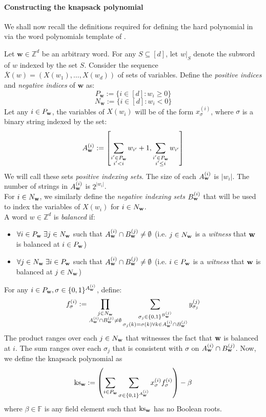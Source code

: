 \documentclass[11pt]{article}
\newcommand{\Boo}{\{0,1 \}}
\newcommand{\F}{\mathbb{F}}
\begin{document}
\paragraph{Constructing the knapsack polynomial}
We shall now recall the definitions required for defining the hard polynomial in \cite{GHT} via the word polynomials template of \cite{LST}. 

Let $\mathbf{w} \in \mathbb{Z}^d$ be an arbitrary word. For any $S\subseteq [d]$, let $w|_{S}$ denote the subword of $w$ indexed by the set $S$. Consider the sequence $\overline{X}(w) = (X(w_1),\dots, X(w_d))$ of sets of variables. Define the \emph{positive indices} and \emph{negative indices} of $\mathbf{w}$ as:
$$P_{\mathbf{w}} := \{i\in [d]: w_i \geq 0\}$$
$$N_{\mathbf{w}} := \{i\in [d]: w_i < 0\}$$
Let any $i\in P_{\mathbf{w}}$, the variables of $X(w_i)$ will be of the form $x_{\sigma}^{(i)}$, where $\sigma$ is a binary string indexed by the set:
$$A_{\mathbf{w}}^{(i)} := \left[ \sum_{\substack{i' \in P_{\mathbf{w}}\\ i'<i}} w_{i'} + 1,\sum_{\substack{i' \in P_{\mathbf{w}}\\ i'\leq i}}w_{i'}\right ]$$
We will call these sets \emph{positive indexing sets}. The size of each $A_{\mathbf{w}}^{(i)}$ is $|w_i|$. The number of strings in $A_{\mathbf{w}}^{(i)}$ is $2^{|w_i|}$. \\
For $i\in N_{\mathbf{w}}$, we similarly define the \emph{negative indexing sets} $B_{\mathbf{w}}^{(i)}$ that will be used to index the variables of $X(w_i)$ for $i\in N_{\mathbf{w}}$. \\
A word $w\in \mathbb{Z}^d$ is \emph{balanced} if:
\begin{itemize}
    \item $\forall i\in P_{\mathbf{w}} \; \exists j \in N_{\mathbf{w}}$ such that $A_{\mathbf{w}}^{(i)} \cap B_{\mathbf{w}}^{(j)} \neq \emptyset$ (i.e. $j\in N_{\mathbf{w}}$ is a \emph{witness} that $\mathbf{w}$ is balanced at $i\in P_{\mathbf{w}}$)
    \item $\forall j\in N_{\mathbf{w}} \; \exists i \in P_{\mathbf{w}}$ such that $A_{\mathbf{w}}^{(i)} \cap B_{\mathbf{w}}^{(j)} \neq \emptyset$ (i.e. $i\in P_{\mathbf{w}}$ is a \emph{witness} that $\mathbf{w}$ is balanced at $j\in N_{\mathbf{w}}$)
\end{itemize}


For any $i\in P_\bfw, \sigma \in \Boo^{\Aw^{(i)}}$, define: 
\begin{equation}
    f_\sigma^{(i)} := \prod_{\substack{j \in N_\bfw \\ \Aw^{(i)} \cap \Bw^{(j)} \neq \emptyset}} \sum_{\substack{\sigma_j \in \Boo^{\Bw^{(j)}}\\ \sigma_j(k) = \sigma(k) \forall k \in  \Aw^{(i)} \cap \Bw^{(j)} }} y_{\sigma_j}^{(j)}
\end{equation}
The product ranges over each $j \in N_{\mathbf{w}}$ that witnesses the fact that $\mathbf{w}$ is balanced at $i$. The sum ranges over each $\sigma_j$ that is consistent with $\sigma$ on $A_{\mathbf{w}}^{(i)} \cap B_{\mathbf{w}}^{(j)}$. Now, we define the knapsack polynomial as
\begin{equation}
    \ksw := \left ( \sum_{i\in P_\bfw}\sum_{\sigma \in \Boo^{\Aw^{(i)}}} x_{\sigma}^{(i)}f_\sigma^{(i)} \right ) - \beta
\end{equation}
where $\beta \in \F$ is any field element such that $\operatorname{ks}_{\mathbf{w}}$ has no Boolean roots.
\end{document}
